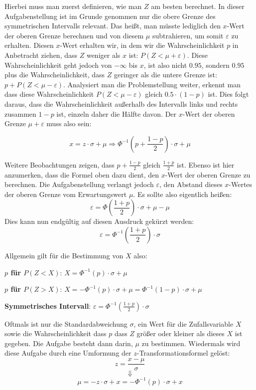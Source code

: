 Hierbei muss man zuerst definieren, wie man $Z$ am besten berechnet. In dieser Aufgabenstellung ist im Grunde genommen nur die obere Grenze des symmetrischen Intervalls relevant. Das hei\ss{}t, man m\"{u}sste lediglich den $x$-Wert der oberen Grenze berechnen und von diesem $\mu$ subtrahieren, um somit $\varepsilon$ zu erhalten. Diesen $x$-Wert erhalten wir, in dem wir die Wahrscheinlichkeit $p$ in Anbetracht ziehen, dass $Z$ weniger als $x$ ist: $P(Z < \mu + \varepsilon)$. Diese Wahrscheinlichkeit geht jedoch von $-\infty$ bis $x$, ist also nicht $0.95$, sondern $0.95$ plus die Wahrscheinlichkeit, dass $Z$ geringer als die untere Grenze ist: $p + P(Z < \mu - \varepsilon)$. Analysiert man die Problemstellung weiter, erkennt man dass diese Wahrscheinlichkeit $P(Z < \mu - \varepsilon)$ gleich $0.5 \cdot (1 - p)$ ist. Dies folgt daraus, dass die Wahrscheinlichkeit au\ss{}erhalb des Intervalls links und rechts zusammen $1 - p$ ist, einzeln daher die H\"{a}lfte davon. Der $x$-Wert der oberen Grenze $\mu + \varepsilon$ muss also sein: 

$$x = z \cdot \sigma + \mu \Rightarrow \Phi^{-1}\left(p + \frac{1 -p}{2}\right) \cdot \sigma + \mu$$ 

\pagebreak

Weitere Beobachtungen zeigen, dass $p + \frac{1 - p}{2}$ gleich $\frac{1 + p}{2}$ ist. Ebenso ist hier anzumerken, dass die Formel oben dazu dient, den $x$-Wert der oberen Grenze zu berechnen. Die Aufgabenstellung verlangt jedoch $\varepsilon$, den Abstand dieses $x$-Wertes der oberen Grenze vom Erwartungswert $\mu$. Es sollte also eigentlich hei\ss{}en: $$\varepsilon = \Phi\left(\frac{1 + p}{2}\right) \cdot \sigma + \mu - \mu$$ Dies kann nun endg\"{u}ltig auf diesen Ausdruck gek\"{u}rzt werden: $$\varepsilon = \Phi^{-1}\left(\frac{1 + p}{2}\right) \cdot \sigma$$

Allgemein gilt f\"{u}r die Bestimmung von $X$ also:

\textbf{$p$ f\"{u}r $P(Z < X)$}: $X = \Phi^{-1}(p) \cdot \sigma + \mu$

\textbf{$p$ f\"{u}r $P(Z > X)$}: $X = -\Phi^{-1}(p) \cdot \sigma + \mu = \Phi^{-1}(1 - p) \cdot \sigma + \mu$

\textbf{Symmetrisches Intervall}: $\varepsilon = \Phi^{-1}\left(\frac{1 + p}{2}\right) \cdot \sigma$


Oftmals ist nur die Standardabweichung $\sigma$, ein Wert f\"{u}r die Zufallsvariable $X$ sowie die Wahrscheinlichkeit dass $p$ dass $Z$ gr\"{o}\ss{}er oder kleiner als dieses $X$ ist gegeben. Die Aufgabe besteht dann darin, $\mu$ zu bestimmen. Wiedermals wird diese Aufgabe durch eine Umformung der $z$-Transformationsformel gel\"{o}st: $$z = \frac{x - \mu}{\sigma}$$ $$\Downarrow$$ $$\mu = -z \cdot \sigma + x = -\Phi^{-1}(p) \cdot \sigma + x$$

